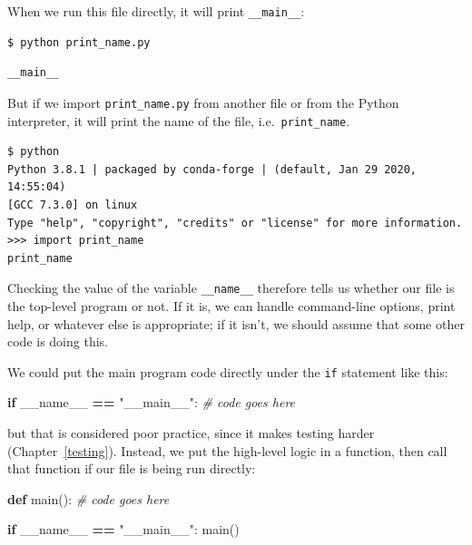 \documentclass[
]{krantz}
\makeatletter
\newenvironment{Shaded}{\begin{snugshade}}{\end{snugshade}}
\newcommand{\CommentTok}[1]{\textcolor[rgb]{0.56,0.35,0.01}{\textit{#1}}}
\newcommand{\ControlFlowTok}[1]{\textcolor[rgb]{0.13,0.29,0.53}{\textbf{#1}}}
\newcommand{\KeywordTok}[1]{\textcolor[rgb]{0.13,0.29,0.53}{\textbf{#1}}}
\newcommand{\NormalTok}[1]{#1}
\newcommand{\OperatorTok}[1]{\textcolor[rgb]{0.81,0.36,0.00}{\textbf{#1}}}
\newcommand{\StringTok}[1]{\textcolor[rgb]{0.31,0.60,0.02}{#1}}
\newcommand{\VariableTok}[1]{\textcolor[rgb]{0.00,0.00,0.00}{#1}}
\newenvironment{kframe}{%
\medskip{}
\setlength{\fboxsep}{.8em}
 \def\at@end@of@kframe{}%
 \ifinner\ifhmode%
  \def\at@end@of@kframe{\end{minipage}}%
  \begin{minipage}{\columnwidth}%
 \fi\fi%
 \def\FrameCommand##1{\hskip\@totalleftmargin \hskip-\fboxsep
 \colorbox{shadecolor}{##1}\hskip-\fboxsep
     \hskip-\linewidth \hskip-\@totalleftmargin \hskip\columnwidth}%
 \MakeFramed {\advance\hsize-\width
   \@totalleftmargin\z@ \linewidth\hsize
   \@setminipage}}%
 {\par\unskip\endMakeFramed%
 \at@end@of@kframe}
\renewenvironment{Shaded}{\begin{kframe}}{\end{kframe}}
\makeatother
\begin{document}
When we run this file directly,
it will print \texttt{\_\_main\_\_}:

\begin{verbatim}
$ python print_name.py
\end{verbatim}

\begin{verbatim}
__main__
\end{verbatim}

But if we import \texttt{print\_name.py} from another file
or from the Python interpreter,
it will print the name of the file,
i.e.~\texttt{print\_name}.

\begin{verbatim}
$ python
Python 3.8.1 | packaged by conda-forge | (default, Jan 29 2020, 14:55:04)
[GCC 7.3.0] on linux
Type "help", "copyright", "credits" or "license" for more information.
>>> import print_name
print_name
\end{verbatim}

Checking the value of the variable \texttt{\_\_name\_\_}
therefore tells us whether our file is the top-level program or not.
If it is,
we can handle command-line options, print help, or whatever else is appropriate;
if it isn't,
we should assume that some other code is doing this.

We could put the main program code directly under the \texttt{if} statement like this:

\begin{Shaded}
\begin{Highlighting}[]
\ControlFlowTok{if} \VariableTok{\_\_name\_\_} \OperatorTok{==} \StringTok{"\_\_main\_\_"}\NormalTok{:}
    \CommentTok{\# code goes here}
\end{Highlighting}
\end{Shaded}

but that is considered poor practice,
since it makes testing harder (Chapter~\ref{testing}).
Instead,
we put the high-level logic in a function,
then call that function if our file is being run directly:

\begin{Shaded}
\begin{Highlighting}[]
\KeywordTok{def}\NormalTok{ main():}
    \CommentTok{\# code goes here}


\ControlFlowTok{if} \VariableTok{\_\_name\_\_} \OperatorTok{==} \StringTok{"\_\_main\_\_"}\NormalTok{:}
\NormalTok{    main()}
\end{Highlighting}
\end{Shaded}
\end{document}
